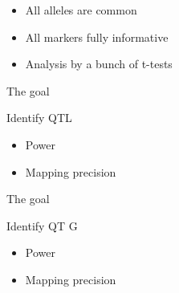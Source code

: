 \documentclass[12pt]{article}
\newcommand{\headsize}{\fontsize{35}{35} \selectfont}
\newcommand{\smallsize}{\fontsize{25}{30} \selectfont}
\begin{document}
{\hfill \begin{minipage}{9.5in}
\begin{itemize}
\itemsep24pt
\item All alleles are common
\item All markers fully informative
\item Analysis by a bunch of t-tests
\end{itemize}
\end{minipage}


\newpage


\headsize \color{myyellow}
\hfill \begin{minipage}{5.75in}
\centering
The goal
\end{minipage}

\vspace{25mm}

\color{mywhite}
\smallsize

\hfill \begin{minipage}{9.5in}
Identify QTL
\end{minipage}

\vspace{15mm}

\hfill \begin{minipage}{9in}
\color{myblue}
\begin{itemize}
\itemsep24pt
\item Power
\item Mapping precision
\end{itemize}
\end{minipage}

\newpage

\addtocounter{page}{-1}

\headsize \color{myyellow}
\hfill \begin{minipage}{5.75in}
\centering
The goal
\end{minipage}

\vspace{25mm}

\color{mywhite}
\smallsize

\hfill \begin{minipage}{9.5in}
Identify QT{\color{mypink} G}
\end{minipage}

\vspace{15mm}

\hfill \begin{minipage}{9in}
\color{myblue}
\begin{itemize}
\itemsep24pt
\item Power
\item Mapping precision
\end{itemize}
\end{minipage}




}
\end{document}
